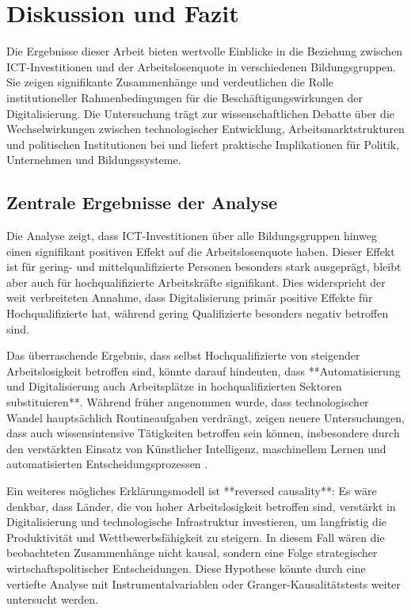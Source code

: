 
\section{Diskussion und Fazit}

Die Ergebnisse dieser Arbeit bieten wertvolle Einblicke in die Beziehung zwischen 
\ac{ICT}-Investitionen und der Arbeitslosenquote in verschiedenen Bildungsgruppen. Sie 
zeigen signifikante Zusammenhänge und verdeutlichen die Rolle institutioneller 
Rahmenbedingungen für die Beschäftigungswirkungen der Digitalisierung. Die Untersuchung 
trägt zur wissenschaftlichen Debatte über die Wechselwirkungen zwischen technologischer 
Entwicklung, Arbeitsmarktstrukturen und politischen Institutionen bei und liefert 
praktische Implikationen für Politik, Unternehmen und Bildungssysteme.

\subsection{Zentrale Ergebnisse der Analyse}

Die Analyse zeigt, dass \ac{ICT}-Investitionen über alle Bildungsgruppen hinweg einen 
signifikant positiven Effekt auf die Arbeitslosenquote haben. Dieser Effekt ist für 
gering- und mittelqualifizierte Personen besonders stark ausgeprägt, bleibt aber auch für 
hochqualifizierte Arbeitskräfte signifikant. Dies widerspricht der weit verbreiteten 
Annahme, dass Digitalisierung primär positive Effekte für Hochqualifizierte hat, während 
gering Qualifizierte besonders negativ betroffen sind. 

Das überraschende Ergebnis, dass selbst Hochqualifizierte von steigender Arbeitslosigkeit 
betroffen sind, könnte darauf hindeuten, dass **Automatisierung und Digitalisierung auch 
Arbeitsplätze in hochqualifizierten Sektoren substituieren**. Während früher angenommen wurde, 
dass technologischer Wandel hauptsächlich Routineaufgaben verdrängt, zeigen neuere 
Untersuchungen, dass auch wissensintensive Tätigkeiten betroffen sein können, insbesondere 
durch den verstärkten Einsatz von Künstlicher Intelligenz, maschinellem Lernen und 
automatisierten Entscheidungsprozessen \parencite[vgl.][S. 3-5]{brynjolfsson2014secondmachineage}.

Ein weiteres mögliches Erklärungsmodell ist **reversed causality**: Es wäre denkbar, dass Länder, 
die von hoher Arbeitslosigkeit betroffen sind, verstärkt in Digitalisierung und technologische 
Infrastruktur investieren, um langfristig die Produktivität und Wettbewerbsfähigkeit zu steigern. 
In diesem Fall wären die beobachteten Zusammenhänge nicht kausal, sondern eine Folge strategischer 
wirtschaftspolitischer Entscheidungen. Diese Hypothese könnte durch eine vertiefte Analyse mit 
Instrumentalvariablen oder Granger-Kausalitätstests weiter untersucht werden.

